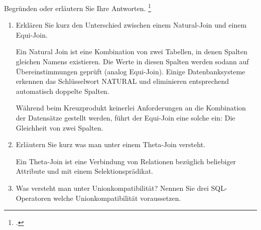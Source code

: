\documentclass{bschlangaul-aufgabe}
\begin{document}

Begründen oder erläutern Sie Ihre Antworten.
\footcite[Thema 2 Teilaufgabe 2 Aufgabe 6]{examen:66116:2019:09}

\begin{enumerate}

%

\item Erklären Sie kurz den Unterschied zwischen einem
Natural-Join und einem Equi-Join.

\begin{bAntwort}
Ein Natural Join ist eine Kombination von zwei Tabellen, in denen
Spalten gleichen Namens existieren. Die Werte in diesen Spalten werden
sodann auf Übereinstimmungen geprüft (analog Equi-Join). Einige
Datenbanksysteme erkennen das Schlüsselwort NATURAL und eliminieren
entsprechend automatisch doppelte Spalten.

Während beim Kreuzprodukt keinerlei Anforderungen an die Kombination der
Datensätze gestellt werden, führt der Equi-Join eine solche ein: Die
Gleichheit von zwei Spalten.

\end{bAntwort}

%

\item Erläutern Sie kurz was man unter einem
Theta-Join versteht.

\begin{bAntwort}
Ein Theta-Join ist eine Verbindung von Relationen bezüglich beliebiger
Attribute und mit einem Selektionsprädikat.
\end{bAntwort}

%

\item Was versteht man unter Unionkompatibilität? Nennen Sie drei
SQL-Operatoren welche Unionkompatibilität voraussetzen.


\end{enumerate}
\end{document}
